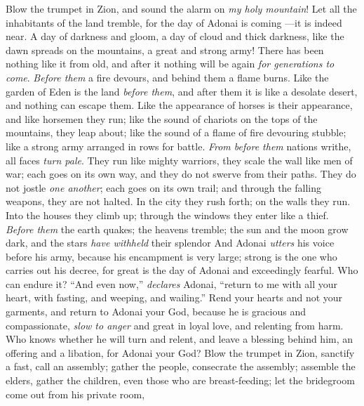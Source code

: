 \begin{biblechapter} %
 Blow the trumpet in Zion, 
and sound the alarm on \textit{my holy mountain}! 
Let all the inhabitants of the land tremble, 
for the day of Adonai is coming 
—it is indeed near.
\verse A day of darkness and gloom, 
a day of cloud and thick darkness, 
like the dawn spreads on the mountains, 
a great and strong army! 
There has been nothing like it from old, 
and after it nothing will be again \textit{for generations to come}.
\verse \textit{Before them} a fire devours, 
and behind them a flame burns. 
Like the garden of Eden is the land \textit{before them}, 
and after them it is like a desolate desert, 
and nothing can escape them.
\verse Like the appearance of horses is their appearance, 
and like horsemen they run;
\verse like the sound of chariots on the tops of the mountains, they leap about; 
like the sound of a flame of fire 
devouring stubble; 
like a strong army arranged 
in rows for battle.
\verse \textit{From before them} nations writhe, 
all faces \textit{turn pale}.
\verse They run like mighty warriors, 
they scale the wall like men of war; 
each goes on its own way, 
and they do not swerve from their paths.
\verse They do not jostle \textit{one another}; 
each goes on its own trail; 
and through the falling weapons, 
they are not halted.
\verse In the city they rush forth; 
on the walls they run. 
Into the houses they climb up; 
through the windows 
they enter like a thief.
\verse \textit{Before them} the earth quakes; 
the heavens tremble; 
the sun and the moon grow dark, 
and the stars \textit{have withheld} their splendor
\verse And Adonai \textit{utters} his voice before his army, 
because his encampment is very large; 
strong is the one who carries out his decree, 
for great is the day of Adonai 
and exceedingly fearful. 
Who can endure it?
 “And even now,” \textit{declares} Adonai, 
“return to me with all your heart, 
with fasting, and weeping, and wailing.”
\verse Rend your hearts and not your garments, 
and return to Adonai your God, 
because he is gracious and compassionate, 
\textit{slow to anger} and great in loyal love, 
and relenting from harm.
\verse Who knows whether he will turn and relent, 
and leave a blessing behind him, 
an offering and a libation, 
for Adonai your God?
\verse Blow the trumpet in Zion, 
sanctify a fast, call an assembly;
\verse gather the people, consecrate the assembly; 
assemble the elders, gather the children, 
even those who are breast-feeding; 
let the bridegroom come out from his private room, 

\end{biblechapter}
